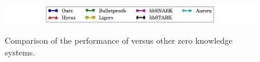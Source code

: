 \begin{figure}[htbp]
{%
}%
%
%
\quad
\centering
\includegraphics[width = 6.5in]{legend.pdf}
\caption{\label{ZKGKR}Comparison of the performance of \name{} versus other zero knowledge systems.}
\end{figure}

